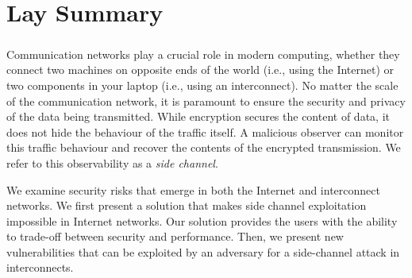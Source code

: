 \chapter{Lay Summary}


\paragraph{} 
Communication networks play a crucial role in modern computing, whether they connect two machines on opposite ends of the world (i.e., using the Internet) or two components in your laptop (i.e., using an interconnect). 
No matter the scale of the communication network, it is paramount to ensure the security and privacy of the data being transmitted.
While encryption secures the content of data, it does not hide the behaviour of the traffic itself.
A malicious observer can monitor this traffic behaviour and recover the contents of the encrypted transmission.
We refer to this observability as a \textit{side channel}.

We examine security risks that emerge in both the Internet and interconnect networks.
We first present a solution that makes side channel exploitation impossible in Internet networks.
Our solution provides the users with the ability to trade-off between security and performance.
Then, we present new vulnerabilities that can be exploited by an adversary for a side-channel attack in interconnects.
